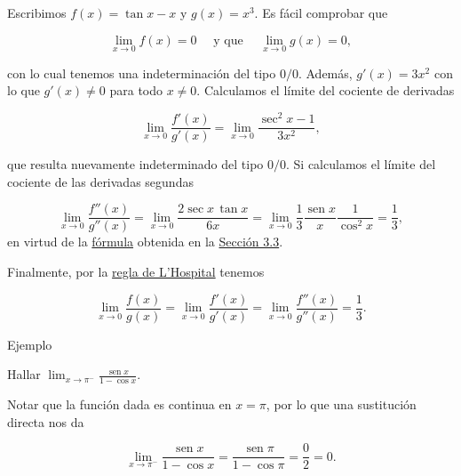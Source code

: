 \documentclass[
  letterpaper,
]{book}
\theoremstyle{plain}
\theoremstyle{remark}
\begin{document}
\begin{tcolorbox}[enhanced jigsaw, opacityback=0, left=2mm, opacitybacktitle=0.6, toprule=.15mm, bottomrule=.15mm, colbacktitle=quarto-callout-tip-color!10!white, titlerule=0mm, bottomtitle=1mm, title=\textcolor{quarto-callout-tip-color}{\faLightbulb}\hspace{0.5em}{Solución}, toptitle=1mm, colframe=quarto-callout-tip-color-frame, colback=white, breakable, rightrule=.15mm, arc=.35mm, leftrule=.75mm, coltitle=black]

Escribimos \(f(x)=\tan x-x\) y \(g(x)=x^3\). Es fácil comprobar que

\[
\lim_{x\to 0} f(x)=0 \quad \text{ y que } \quad \lim_{x\to 0} g(x)=0,
\]

con lo cual tenemos una indeterminación del tipo \(0/0\). Además,
\(g'(x)=3x^2\) con lo que \(g'(x)\neq 0\) para todo \(x\neq 0\).
Calculamos el límite del cociente de derivadas

\[
\lim_{x\to 0} \frac{f'(x)}{g'(x)}=\lim_{x\to 0} \frac{\sec^2 x-1}{3x^2},
\]

que resulta nuevamente indeterminado del tipo \(0/0\). Si calculamos el
límite del cociente de las derivadas segundas

\[
\lim_{x\to 0} \frac{f''(x)}{g''(x)}=\lim_{x\to 0} \frac{2\sec x\,\tan x}{6x}=\lim_{x\to 0} \frac{1}{3}\frac{\operatorname{sen} x}{x}\frac{1}{\cos^2 x}=\frac{1}{3},
\] en virtud de la \href{-@eq-limite-seno}{fórmula} obtenida en la
\hyperref[seccion_3.3]{Sección 3.3}.

Finalmente, por la \hyperref[teo-regla-LH]{regla de L'Hospital} tenemos

\[
\lim_{x\to 0} \frac{f(x)}{g(x)}=\lim_{x\to 0} \frac{f'(x)}{g'(x)}=\lim_{x\to 0} \frac{f''(x)}{g''(x)}=\frac{1}{3}.
\]

\end{tcolorbox}

Ejemplo

Hallar
\(\displaystyle \lim_{x\to \pi^-} \frac{\operatorname{sen} x}{1-\cos x}\).

\begin{tcolorbox}[enhanced jigsaw, opacityback=0, left=2mm, opacitybacktitle=0.6, toprule=.15mm, bottomrule=.15mm, colbacktitle=quarto-callout-tip-color!10!white, titlerule=0mm, bottomtitle=1mm, title=\textcolor{quarto-callout-tip-color}{\faLightbulb}\hspace{0.5em}{Solución}, toptitle=1mm, colframe=quarto-callout-tip-color-frame, colback=white, breakable, rightrule=.15mm, arc=.35mm, leftrule=.75mm, coltitle=black]

Notar que la función dada es continua en \(x=\pi\), por lo que una
sustitución directa nos da

\[
 \lim_{x\to \pi^-} \frac{\operatorname{sen} x}{1-\cos x}=\frac{\operatorname{sen} \pi}{1-\cos \pi}=\frac{0}{2}=0.
\]

\end{tcolorbox}
\end{document}
